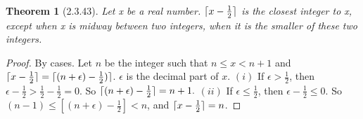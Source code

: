 \documentclass[a4paper, 12pt]{article}
\theoremstyle{plain}
\newtheorem*{theorem*}{Theorem}
\DeclarePairedDelimiter{\ceil}{\lceil}{\rceil}
\begin{document}
	
	\begin{theorem*}[2.3.43]
		Let x be a real number. $\ceil{x - \frac{1}{2}}$ is the closest integer to x, except when 
		x is midway between two integers, when it is the smaller of these two integers.
	\end{theorem*}
	
	\begin{proof}
		By cases. Let $n$ be the integer such that $n \le x < n+1$ and \newline 
		$\ceil{x - \frac{1}{2}} = \ceil{(n + \epsilon) - \frac{1}{2})}$. $\epsilon$ is the decimal 
		part of $x$.
		\newline \newline $(i)$ If $\epsilon > \frac{1}{2}$, then 
		$\epsilon - \frac{1}{2} > \frac{1}{2} - \frac{1}{2} = 0$. So 
		$\ceil{(n + \epsilon) - \frac{1}{2}} = n + 1.$ \newline \newline $(ii)$ If 
		$\epsilon \le \frac{1}{2}$, then $\epsilon - \frac{1}{2} \le 0$. So 
		$(n - 1) \le [(n + \epsilon) - \frac{1}{2}] < n$, and $\ceil{x - \frac{1}{2}} = n$.
	\end{proof}
\end{document}
